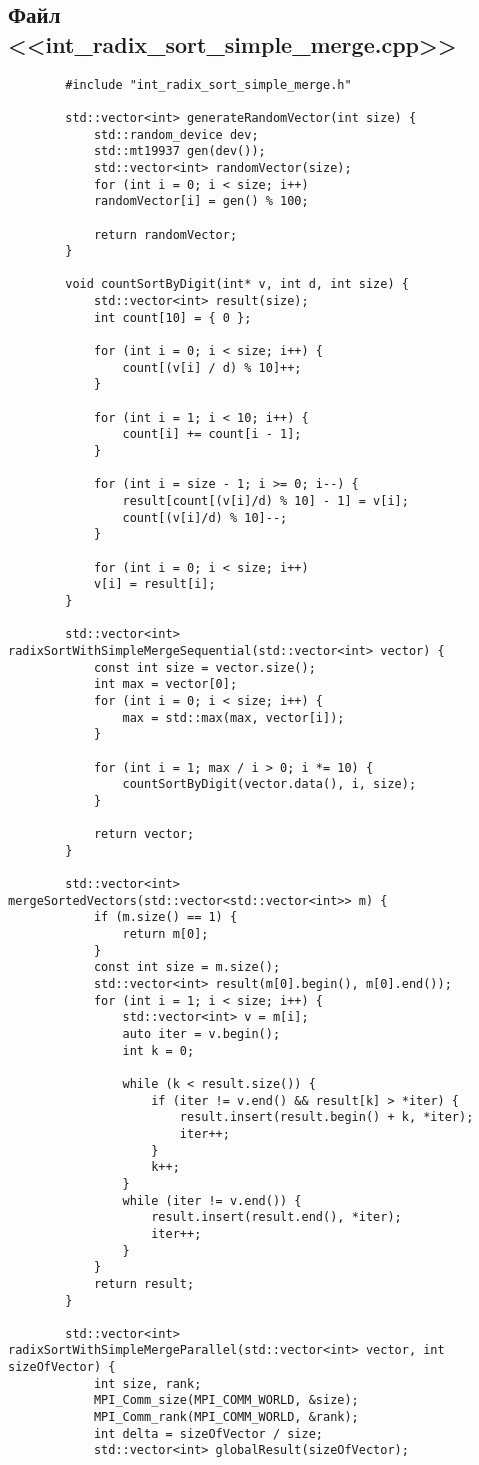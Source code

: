 \documentclass[a4paper, 14pt]{article}
\begin{document}
	\newpage
	\subsection*{\centering Файл <<int\_radix\_sort\_simple\_merge.cpp>>}
	\begin{verbatim}
		#include "int_radix_sort_simple_merge.h"
		
		std::vector<int> generateRandomVector(int size) {
			std::random_device dev;
			std::mt19937 gen(dev());
			std::vector<int> randomVector(size);
			for (int i = 0; i < size; i++)
			randomVector[i] = gen() % 100;
			
			return randomVector;
		}
		
		void countSortByDigit(int* v, int d, int size) {
			std::vector<int> result(size);
			int count[10] = { 0 };
			
			for (int i = 0; i < size; i++) {
				count[(v[i] / d) % 10]++;
			}
			
			for (int i = 1; i < 10; i++) {
				count[i] += count[i - 1];
			}
			
			for (int i = size - 1; i >= 0; i--) {
				result[count[(v[i]/d) % 10] - 1] = v[i];
				count[(v[i]/d) % 10]--;
			}
			
			for (int i = 0; i < size; i++)
			v[i] = result[i];
		}
		
		std::vector<int> radixSortWithSimpleMergeSequential(std::vector<int> vector) {
			const int size = vector.size();
			int max = vector[0];
			for (int i = 0; i < size; i++) {
				max = std::max(max, vector[i]);
			}
			
			for (int i = 1; max / i > 0; i *= 10) {
				countSortByDigit(vector.data(), i, size);
			}
			
			return vector;
		}
		
		std::vector<int> mergeSortedVectors(std::vector<std::vector<int>> m) {
			if (m.size() == 1) {
				return m[0];
			}
			const int size = m.size();
			std::vector<int> result(m[0].begin(), m[0].end());
			for (int i = 1; i < size; i++) {
				std::vector<int> v = m[i];
				auto iter = v.begin();
				int k = 0;
				
				while (k < result.size()) {
					if (iter != v.end() && result[k] > *iter) {
						result.insert(result.begin() + k, *iter);
						iter++;
					}
					k++;
				}
				while (iter != v.end()) {
					result.insert(result.end(), *iter);
					iter++;
				}
			}
			return result;
		}
		
		std::vector<int> radixSortWithSimpleMergeParallel(std::vector<int> vector, int sizeOfVector) {
			int size, rank;
			MPI_Comm_size(MPI_COMM_WORLD, &size);
			MPI_Comm_rank(MPI_COMM_WORLD, &rank);
			int delta = sizeOfVector / size;
			std::vector<int> globalResult(sizeOfVector);
			

\end{verbatim}
\end{document}
